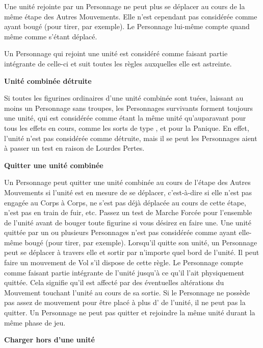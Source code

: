 Une unité rejointe par un Personnage ne peut plus se déplacer au cours de la même étape des Autres Mouvements. Elle n'est cependant pas considérée comme ayant bougé (pour tirer, par exemple). Le Personnage lui-même compte quand même comme s'étant déplacé.

Un Personnage qui rejoint une unité est considéré comme faisant partie intégrante de celle-ci et suit toutes les règles auxquelles elle est astreinte.

\noindent\textbf{Unité combinée détruite}

Si toutes les figurines ordinaires d'une unité combinée sont tuées, laissant au moins un Personnage sans troupes, les Personnages survivants forment toujours une unité, qui est considérée comme étant la même unité qu'auparavant pour tous les effets en cours, comme les sorts de type \lastsoneturn{}, et pour la Panique. En effet, l'unité n'est pas considérée comme détruite, mais il se peut les Personnages aient à passer un test en raison de Lourdes Pertes.

\noindent\textbf{Quitter une unité combinée}

Un Personnage peut quitter une unité combinée au cours de l'étape des Autres Mouvements si l'unité est en mesure de se déplacer, c'est-à-dire si elle n'est pas engagée au Corps à Corps, ne s'est pas déjà déplacée au cours de cette étape, n'est pas en train de fuir, etc. Passez un test de Marche Forcée pour l'ensemble de l'unité avant de bouger toute figurine si vous désirez en faire une. Une unité quittée par un ou plusieurs Personnages n'est pas considérée comme ayant elle-même bougé (pour tirer, par exemple). Lorsqu'il quitte son unité, un Personnage peut se déplacer à travers elle et sortir par n'importe quel bord de l'unité. Il peut faire un mouvement de Vol s'il dispose de cette règle. Le Personnage compte comme faisant partie intégrante de l'unité jusqu'à ce qu'il l'ait physiquement quittée. Cela signifie qu'il est affecté par des éventuelles altérations du Mouvement touchant l'unité au cours de sa sortie. Si le Personnage ne possède pas assez de mouvement pour être placé à plus d' de l'unité, il ne peut pas la quitter. Un Personnage ne peut pas quitter et rejoindre la même unité durant la même phase de jeu.

\noindent\textbf{Charger hors d'une unité}

